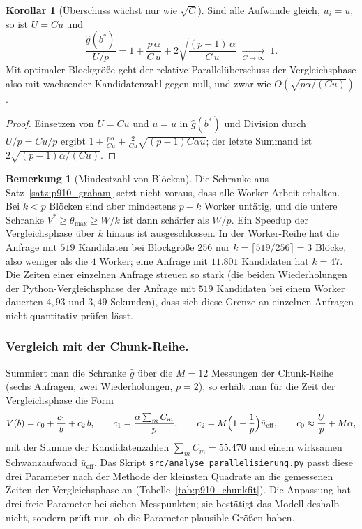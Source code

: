 \documentclass[a4paper,12pt, twoside]{report}
\theoremstyle{definition}
\newtheorem{bemerkung}{Bemerkung}
\newtheorem{korollar}{Korollar}
\begin{document}
\begin{korollar}[Überschuss wächst nur wie $\sqrt C$]
\label{kor:p910_wurzel}
Sind alle Aufwände gleich, $u_i=u$, so ist $U=Cu$ und
\[
\frac{\hat g(b^\ast)}{U/p}=1+\frac{p\,\alpha}{C\,u}+2\sqrt{\frac{(p-1)\,\alpha}{C\,u}}\;\xrightarrow[C\to\infty]{}\;1.
\]
Mit optimaler Blockgröße geht der relative Parallelüberschuss der Vergleichsphase also mit wachsender Kandidatenzahl gegen null, und zwar wie $O(\sqrt{p\alpha/(Cu)})$.
\end{korollar}

\begin{proof}
Einsetzen von $U=Cu$ und $\bar u=u$ in $\hat g(b^\ast)$ und Division durch $U/p=Cu/p$ ergibt $1+\frac{p\alpha}{Cu}+\frac{2}{Cu}\sqrt{(p-1)C\alpha u}$; der letzte Summand ist $2\sqrt{(p-1)\alpha/(Cu)}$.
\end{proof}

\begin{bemerkung}[Mindestzahl von Blöcken]
\label{bem:p910_mindest}
Die Schranke aus Satz~\ref{satz:p910_graham} setzt nicht voraus, dass alle Worker Arbeit erhalten. Bei $k<p$ Blöcken sind aber mindestens $p-k$ Worker untätig, und die untere Schranke $V^\ast\ge\theta_{\max}\ge W/k$ ist dann schärfer als $W/p$. Ein Speedup der Vergleichsphase über $k$ hinaus ist ausgeschlossen. In der Worker-Reihe hat die Anfrage mit $519$ Kandidaten bei Blockgröße $256$ nur $k=\lceil 519/256\rceil=3$ Blöcke, also weniger als die $4$ Worker; eine Anfrage mit $11.801$ Kandidaten hat $k=47$. Die Zeiten einer einzelnen Anfrage streuen so stark (die beiden Wiederholungen der Python-Vergleichsphase der Anfrage mit $519$ Kandidaten bei einem Worker dauerten $4{,}93$ und $3{,}49$ Sekunden), dass sich diese Grenze an einzelnen Anfragen nicht quantitativ prüfen lässt.
\end{bemerkung}

\subsubsection{Vergleich mit der Chunk-Reihe.}
Summiert man die Schranke $\hat g$ über die $M=12$ Messungen der Chunk-Reihe (sechs Anfragen, zwei Wiederholungen, $p=2$), so erhält man für die Zeit der Vergleichsphase die Form
\[
V(b)=c_0+\frac{c_1}{b}+c_2\,b,\qquad c_1=\frac{\alpha\sum_mC_m}{p},\qquad c_2=M\Bigl(1-\frac1p\Bigr)\bar u_{\mathrm{eff}},\qquad c_0\approx\frac{U}{p}+M\alpha,
\]
mit der Summe der Kandidatenzahlen $\sum_mC_m=55.470$ und einem wirksamen Schwanzaufwand $\bar u_{\mathrm{eff}}$. Das Skript \texttt{src/analyse\_parallelisierung.py} passt diese drei Parameter nach der Methode der kleinsten Quadrate an die gemessenen Zeiten der Vergleichsphase an (Tabelle~\ref{tab:p910_chunkfit}). Die Anpassung hat drei freie Parameter bei sieben Messpunkten; sie bestätigt das Modell deshalb nicht, sondern prüft nur, ob die Parameter plausible Größen haben.
\end{document}
